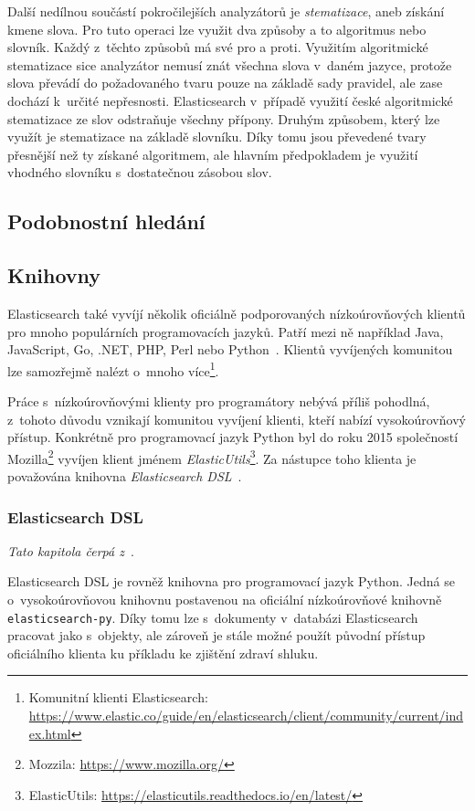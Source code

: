 Další nedílnou součástí pokročilejších analyzátorů je \emph{stematizace}, aneb získání kmene slova. Pro tuto operaci lze využit dva způsoby a to algoritmus nebo slovník. Každý z~těchto způsobů má své pro a proti.
Využitím algoritmické stematizace sice analyzátor nemusí znát všechna slova v~daném jazyce, protože slova převádí do požadovaného tvaru pouze na základě sady pravidel, ale zase dochází k~určité nepřesnosti. Elasticsearch v~případě využití české algoritmické stematizace ze slov odstraňuje všechny přípony.
Druhým způsobem, který lze využít je stematizace na základě slovníku. Díky tomu jsou převedené tvary přesnější než ty získané algoritmem, ale hlavním předpokladem je využití vhodného slovníku s~dostatečnou zásobou slov.

\subsection{Podobnostní hledání}
\blindtext[2]

\subsection{Knihovny}
Elasticsearch také vyvíjí několik oficiálně podporovaných nízkoúrovňových klientů pro mnoho populárních programovacích jazyků. Patří mezi ně například Java, JavaScript, Go, .NET, PHP, Perl nebo Python~\cite{bib:elastic-clients}.
Klientů vyvíjených komunitou lze samozřejmě nalézt o~mnoho více\footnote{Komunitní klienti Elasticsearch: \url{https://www.elastic.co/guide/en/elasticsearch/client/community/current/index.html}}.

Práce s~nízkoúrovňovými klienty pro programátory nebývá příliš pohodlná, z~tohoto důvodu vznikají komunitou vyvíjení klienti, kteří nabízí vysokoúrovňový přístup. Konkrétně pro programovací jazyk Python byl do roku 2015 společností Mozilla\footnote{Mozzila: \url{https://www.mozilla.org/}} vyvíjen klient jménem \emph{ElasticUtils}\footnote{ElasticUtils: \url{https://elasticutils.readthedocs.io/en/latest/}}. Za nástupce toho klienta je považována knihovna \emph{Elasticsearch DSL}~\cite{bib:elastic-utils}.

\subsubsection*{Elasticsearch DSL}
\emph{Tato kapitola čerpá z~\cite{bib:elastic-dsl}}.

Elasticsearch DSL je rovněž knihovna pro programovací jazyk Python. Jedná se o~vysokoúrovňovou knihovnu postavenou na oficiální nízkoúrovňové knihovně \texttt{elasticsearch-py}. Díky tomu lze s~dokumenty v~databázi Elasticsearch pracovat jako s~objekty, ale zároveň je stále možné použít původní přístup oficiálního klienta  ku příkladu ke zjištění zdraví shluku.

